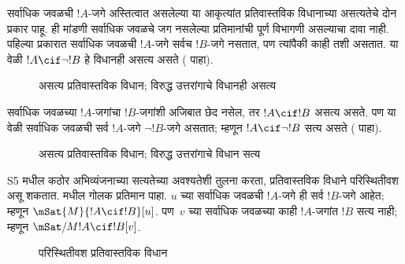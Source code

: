 \documentclass[../../../include/open-logic-section]{subfiles}
\begin{document}
सर्वाधिक जवळची $!A$-जगे अस्तित्वात असलेल्या या
आकृत्यांत प्रतिवास्तविक विधानाच्या असत्यतेचे दोन
प्रकार पाहू. ही मांडणी सर्वाधिक जवळचे जग नसलेल्या
प्रतिमानांची पूर्ण विभागणी असल्याचा दावा नाही.
पहिल्या प्रकारात सर्वाधिक
जवळची $!A$-जगे
सर्वच $!B$-जगे नसतात,
पण त्यांपैकी काही
तशी असतात.
या वेळी $!A \cif
\lnot !B$ हे विधानही
असत्य असते
( पाहा).
\begin{figure}
\begin{center}
\caption{असत्य प्रतिवास्तविक विधान; विरुद्ध उत्तरांगाचे विधानही असत्य}
\end{center}
\end{figure}
सर्वाधिक जवळच्या
$!A$-जगांचा
$!B$-जगांशी
अजिबात छेद नसेल,
तर $!A \cif !B$
असत्य असते. पण
या वेळी सर्वाधिक
जवळची सर्व
$!A$-जगे
$\lnot !B$-जगे
असतात; म्हणून
$!A \cif \lnot !B$
सत्य असते
( पाहा).
\begin{figure}
\begin{center}
\caption{असत्य प्रतिवास्तविक विधान; विरुद्ध उत्तरांगाचे विधान सत्य}
\end{center}
\end{figure}

S5 मधील कठोर अभिव्यंजनाच्या सत्यतेच्या अवश्यतेशी
तुलना करता, प्रतिवास्तविक
विधाने परिस्थितीवश
असू शकतात.
 मधील
गोलक प्रतिमान पाहा.
$u$ च्या सर्वाधिक
जवळची $!A$-जगे
ही सर्व $!B$-जगे
आहेत; म्हणून
$\mSat{M}{!A \cif
  !B}[u]$. पण~$v$
च्या सर्वाधिक जवळच्या
काही $!A$-जगांत
$!B$ सत्य नाही;
म्हणून
$\mSat/{M}{!A \cif !B}[v]$.
\begin{figure}
\begin{center}
\end{center}
\caption{परिस्थितीवश प्रतिवास्तविक विधान}
\end{figure}
\end{document}

